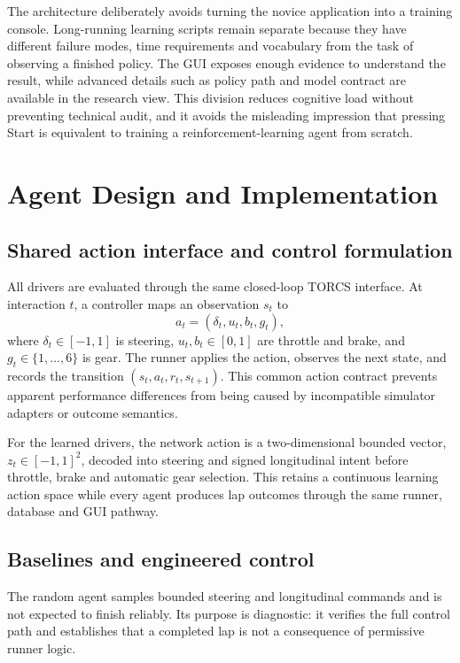 The architecture deliberately avoids turning the novice application into a training console. Long-running learning scripts remain separate because they have different failure modes, time requirements and vocabulary from the task of observing a finished policy. The GUI exposes enough evidence to understand the result, while advanced details such as policy path and model contract are available in the research view. This division reduces cognitive load without preventing technical audit, and it avoids the misleading impression that pressing Start is equivalent to training a reinforcement-learning agent from scratch.

\section{Agent Design and Implementation}
\label{ch:agent-design}

\subsection{Shared action interface and control formulation}

All drivers are evaluated through the same closed-loop TORCS interface. At interaction $t$, a controller maps an observation $s_t$ to
\begin{equation*}
  a_t=(\delta_t,u_t,b_t,g_t),
\end{equation*}
where $\delta_t\in[-1,1]$ is steering, $u_t,b_t\in[0,1]$ are throttle and brake, and $g_t\in\{1,\ldots,6\}$ is gear. The runner applies the action, observes the next state, and records the transition $(s_t,a_t,r_t,s_{t+1})$. This common action contract prevents apparent performance differences from being caused by incompatible simulator adapters or outcome semantics.

For the learned drivers, the network action is a two-dimensional bounded vector, $z_t\in[-1,1]^2$, decoded into steering and signed longitudinal intent before throttle, brake and automatic gear selection. This retains a continuous learning action space while every agent produces lap outcomes through the same runner, database and GUI pathway.

\subsection{Baselines and engineered control}

The random agent samples bounded steering and longitudinal commands and is not expected to finish reliably. Its purpose is diagnostic: it verifies the full control path and establishes that a completed lap is not a consequence of permissive runner logic.

